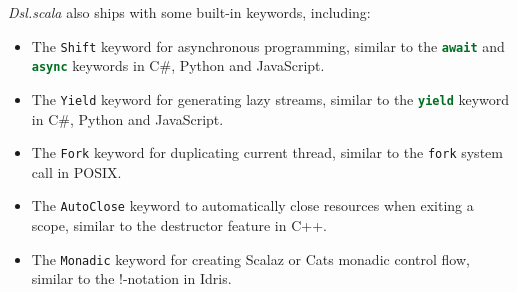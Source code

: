 \textit{Dsl.scala} also ships with some built-in keywords, including:
\begin{itemize}
  \item The \lstinline{Shift} keyword for asynchronous programming, similar to the \lstinline[language=Python]{await} and \lstinline[language=Python]{async} keywords in C\#, Python and JavaScript.
  \item The \lstinline{Yield} keyword for generating lazy streams, similar to the \lstinline[language=Python]{yield} keyword in C\#, Python and JavaScript.
  \item The \lstinline{Fork} keyword for duplicating current thread, similar to the \lstinline{fork} system call in POSIX.
  \item The \lstinline{AutoClose} keyword to automatically close resources when exiting a scope, similar to the destructor feature in C++.
  \item The \lstinline{Monadic} keyword for creating Scalaz \cite{kenji2017scalaz} or Cats \cite{typelevel2017cats} monadic control flow, similar to the !-notation in Idris\cite{brady2013idris}.
\end{itemize}
 






